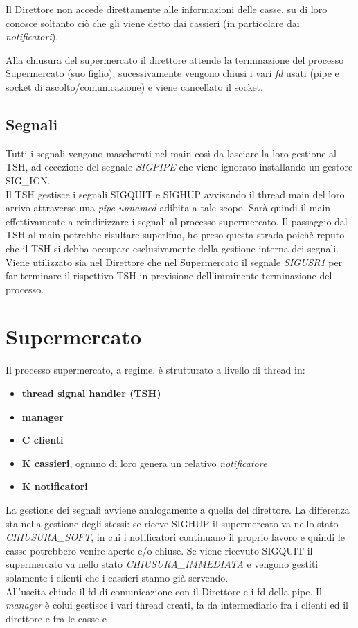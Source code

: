 \documentclass[11pt, a4paper]{article}
\begin{document}
Il Direttore non accede direttamente alle informazioni delle casse, su di loro conosce soltanto ciò che gli viene detto dai cassieri (in particolare dai \textit{notificatori}).

Alla chiusura del supermercato il direttore attende la terminazione del processo Supermercato (suo figlio); sucessivamente vengono chiusi i vari \textit{fd} usati (pipe e socket di ascolto/comunicazione) e viene cancellato il socket.
\subsection{Segnali}
Tutti i segnali vengono mascherati nel main così da lasciare la loro gestione al TSH, ad eccezione del segnale \textit{SIGPIPE} che viene ignorato installando un gestore SIG\_IGN.\\
Il TSH gestisce i segnali SIGQUIT e SIGHUP avvisando il thread main del loro arrivo attraverso una \textit{pipe unnamed} adibita a tale scopo. Sarà quindi il main effettivamente a reindirizzare i segnali al processo supermercato. Il passaggio dal TSH al main potrebbe risultare superlfuo, ho preso questa strada poichè reputo che il TSH si debba occupare esclusivamente della gestione interna dei segnali.\\
Viene utilizzato sia nel Direttore che nel Supermercato il segnale \textit{SIGUSR1} per far terminare il rispettivo TSH in previsione dell'imminente terminazione del processo.
\section{Supermercato}
Il processo supermercato, a regime, è strutturato a livello di thread in:
\begin{itemize}
\item \textbf{thread signal handler (TSH)}
\item \textbf{manager}
\item \textbf{C clienti}
\item \textbf{K cassieri}, ognuno di loro genera un relativo \textit{notificatore}
\item \textbf{K notificatori}
\end{itemize}
La gestione dei segnali avviene analogamente a quella del direttore. La differenza sta nella gestione degli stessi: se riceve SIGHUP il supermercato va nello stato \textit{CHIUSURA\_SOFT}, in cui i notificatori continuano il proprio lavoro e quindi le casse potrebbero venire aperte e/o chiuse. Se viene ricevuto SIGQUIT il supermercato va nello stato \textit{CHIUSURA\_IMMEDIATA} e vengono gestiti solamente i clienti che i cassieri stanno già servendo.\\
All'uscita chiude il fd di comunicazione con il Direttore e i fd della pipe.
Il \textit{manager} è colui gestisce i vari thread creati, fa da intermediario fra i clienti ed il direttore e fra le casse e 
\end{document}
